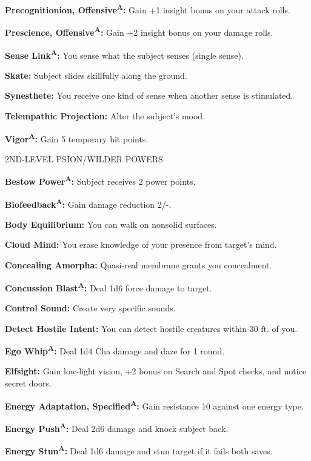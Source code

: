 \documentclass{article}
\begin{document}
\textbf{Precognitionion, Offensive}\textsuperscript{\textbf{A}}\textbf{: }Gain 
+1 insight bonus on your attack rolls.

\textbf{Prescience, Offensive}\textsuperscript{\textbf{A}}\textbf{: }Gain +2 insight 
bonus on your damage rolls.

\textbf{Sense Link}\textsuperscript{\textbf{A}}\textbf{: }You sense what the subject 
senses (single sense).

\textbf{Skate: }Subject slides skillfully along the ground.

\textbf{Synesthete: }You receive one kind of sense when another sense is stimulated.

\textbf{Telempathic Projection: }Alter the subject's mood.

\textbf{Vigor}\textsuperscript{\textbf{A}}\textbf{: }Gain 5 temporary hit points.

2ND-LEVEL PSION/WILDER POWERS

\textbf{Bestow Power}\textsuperscript{\textbf{A}}\textbf{: }Subject receives 2 
power points.

\textbf{Biofeedback}\textsuperscript{\textbf{A}}\textbf{: }Gain damage reduction 
2/-.

\textbf{Body Equilibrium: }You can walk on nonsolid surfaces.

\textbf{Cloud Mind: }You erase knowledge of your presence from target's mind.

\textbf{Concealing Amorpha: }Quasi-real membrane grants you concealment.

\textbf{Concussion Blast}\textsuperscript{\textbf{A}}\textbf{: }Deal 1d6 force 
damage to target.

\textbf{Control Sound: }Create very specific sounds.

\textbf{Detect Hostile Intent: }You can detect hostile creatures within 30 ft. 
of you.

\textbf{Ego Whip}\textsuperscript{\textbf{A}}\textbf{: }Deal 1d4 Cha damage and 
daze for 1 round.

\textbf{Elfsight: }Gain low-light vision, +2 bonus on Search and Spot checks, and 
notice secret doors.

\textbf{Energy Adaptation, Specified}\textsuperscript{\textbf{A}}\textbf{: }Gain 
resistance 10 against one energy type.

\textbf{Energy Push}\textsuperscript{\textbf{A}}\textbf{: }Deal 2d6 damage and 
knock subject back.

\textbf{Energy Stun}\textsuperscript{\textbf{A}}\textbf{: }Deal 1d6 damage and 
stun target if it fails both saves.
\end{document}
